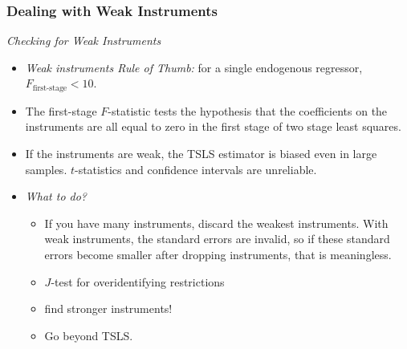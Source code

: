 

\begin{frame}
\frametitle{Dealing with Weak Instruments}
\emph{Checking for Weak Instruments}
\begin{itemize}
\item \emph{Weak instruments Rule of Thumb:} for a single endogenous regressor, $F_{\text{first-stage}}<10$.
\item The first-stage $F$-statistic tests the hypothesis that the coefficients on the instruments are all equal to zero in the first stage of two stage least squares. 
\item If the instruments are weak, the TSLS estimator is biased even in large samples. 
\newlinequad
$t$-statistics and confidence intervals are unreliable.
\item \emph{What to do?}
\begin{itemize}
\item If you have many instruments, discard the weakest instruments.
\newlinequad
With weak instruments, the standard errors are invalid, so if these standard errors become smaller after dropping instruments, that is meaningless.
\item $J$-test for overidentifying restrictions
\item find stronger instruments!
\item Go beyond TSLS.
\end{itemize}
\end{itemize}
\end{frame}


